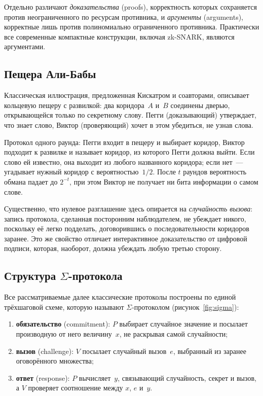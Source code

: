 \documentclass[14pt,a4paper]{extarticle}
\begin{document}
Отдельно различают \emph{доказательства} (proofs), корректность которых сохраняется
против неограниченного по ресурсам противника, и \emph{аргументы} (arguments),
корректные лишь против полиномиально ограниченного противника. Практически все
современные компактные конструкции, включая zk-SNARK, являются аргументами.

\subsection{Пещера Али-Бабы}

Классическая иллюстрация, предложенная Кискатром и соавторами, описывает кольцевую
пещеру с развилкой: два коридора~$A$ и~$B$ соединены дверью, открывающейся только по
секретному слову. Пегги (доказывающий) утверждает, что знает слово, Виктор
(проверяющий) хочет в этом убедиться, не узнав слова.

Протокол одного раунда: Пегги входит в пещеру и выбирает коридор, Виктор подходит к
развилке и называет коридор, из которого Пегги должна выйти. Если слово ей известно,
она выходит из любого названного коридора; если нет~--- угадывает нужный коридор с
вероятностью~$1/2$. После $t$ раундов вероятность обмана падает до $2^{-t}$, при этом
Виктор не получает ни бита информации о самом слове.

Существенно, что нулевое разглашение здесь опирается на \emph{случайность вызова}:
запись протокола, сделанная посторонним наблюдателем, не убеждает никого, поскольку
её легко подделать, договорившись о последовательности коридоров заранее. Это же
свойство отличает интерактивное доказательство от цифровой подписи, которая, наоборот,
должна убеждать любую третью сторону.

\subsection{Структура $\Sigma$-протокола}

Все рассматриваемые далее классические протоколы построены по единой трёхшаговой
схеме, которую называют $\Sigma$-протоколом (рисунок~\ref{fig:sigma}):

\begin{enumerate}
\item \textbf{обязательство} (commitment): $P$ выбирает случайное значение и посылает
производную от него величину~$x$, не раскрывая самой случайности;
\item \textbf{вызов} (challenge): $V$ посылает случайный вызов~$e$, выбранный из
заранее оговорённого множества;
\item \textbf{ответ} (response): $P$ вычисляет~$y$, связывающий случайность, секрет и
вызов, а $V$ проверяет соотношение между $x$, $e$ и~$y$.
\end{enumerate}
\end{document}
